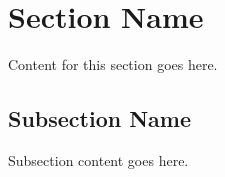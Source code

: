 \section{Section Name}\label{sec:section_name}

Content for this section goes here.

\subsection{Subsection Name}

Subsection content goes here.






